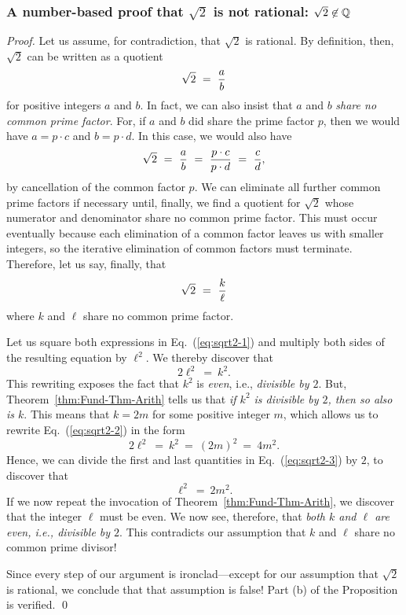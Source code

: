 \subsubsection{A number-based proof that $\sqrt{2}$ is not rational: $\sqrt{2} \not\in \mathbb{Q}$}
\label{sec:classical-proof-sqrt(2)}

\begin{proof}
Let us assume, for contradiction, that $\sqrt{2}$ is rational.  By definition, then, $\sqrt{2}$ can be written as a quotient
\[ \sqrt{2} \ = \ {a \over b} \]
for positive integers $a$ and $b$.  In fact, we can also insist that $a$ and $b$ {\em share no common prime factor}.  For, if $a$ and $b$ did share the prime factor $p$, then we would have $a = p \cdot c$ and $b = p \cdot d$.  In this case, we would also have
\[ \sqrt{2} \ = \ {a \over b} \ = \ \frac{p \cdot c}{p \cdot d} \ = \ {c \over d}, \]
by cancellation of the common factor $p$.  We can eliminate all further common prime factors if necessary until, finally, we find a quotient for $\sqrt{2}$ whose numerator and denominator share no common prime factor.  This must occur eventually because each elimination of a common factor leaves us with smaller integers, so the iterative elimination of common factors must terminate.  Therefore, let us say, finally, that
\begin{equation}
\label{eq:sqrt2-1}
\sqrt{2} \ = \ {k \over \ell}
\end{equation}
where $k$ and $\ell$ share no common prime factor.

\smallskip

Let us square both expressions in Eq.~(\ref{eq:sqrt2-1}) and multiply both sides of the resulting equation by $\ell^2$.  We thereby discover that
\begin{equation}
\label{eq:sqrt2-2}
2 \ell^2 \ = \ k^2.
\end{equation}
This rewriting exposes the fact that $k^2$ is {\em even}, i.e., {\em divisible by $2$}.  But, Theorem~\ref{thm:Fund-Thm-Arith} tells us that {\em if $k^2$ is divisible by $2$, then so also is $k$}.  This means that $k = 2m$ for some positive integer $m$, which allows us to rewrite Eq.~(\ref{eq:sqrt2-2}) in the form
\begin{equation}
\label{eq:sqrt2-3}
2 \ell^2 \ = \ k^2 \ = \ (2m)^2 \ = \ 4m^2.
\end{equation}
Hence, we can divide the first and last quantities in Eq.~(\ref{eq:sqrt2-3}) by $2$, to discover that
\[ \ell^2 \ = \ 2m^2. \]
If we now repeat the invocation of Theorem~\ref{thm:Fund-Thm-Arith}, we discover that the integer $\ell$ must be even.  We now see, therefore, that {\em both $k$ and $\ell$ are even, i.e., divisible by $2$}.  This contradicts our assumption that $k$ and $\ell$ share no common prime divisor!

Since every step of our argument is ironclad---except for our assumption that $\sqrt{2}$ is rational, we conclude that that assumption is false!  Part (b) of the Proposition is verified. \qed
\end{proof}

